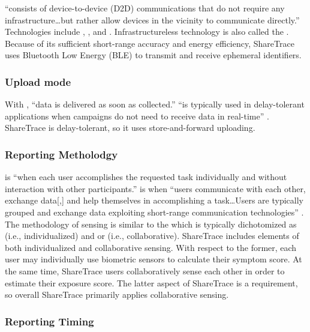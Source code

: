  ``consists of device-to-device (D2D) communications that do not require any infrastructure{\ldots}but rather allow devices in the vicinity to communicate directly.'' Technologies include , , and  \citep{Capponi2019}. Infrastructureless technology is also called the  \citep{Ma2014}. Because of its sufficient short-range accuracy and energy efficiency, ShareTrace uses Bluetooth Low Energy (BLE) to transmit and receive ephemeral identifiers.

\subsubsection{Upload mode}

With , ``data is delivered as soon as collected.''  ``is typically used in delay-tolerant applications when campaigns do not need to receive data in real-time'' \citep{Capponi2019}. ShareTrace is delay-tolerant, so it uses store-and-forward uploading.

\subsubsection{Reporting Metholodgy}

 is ``when each user accomplishes the requested task individually and without interaction with other participants.''  is when ``users communicate with each other, exchange data[,] and help themselves in accomplishing a task{\ldots}Users are typically grouped and exchange data exploiting short-range communication technologies'' \citep{Capponi2019}. The methodology of sensing is similar to the  which is typically dichotomized as  \citep{Lane2010, Ganti2011} (i.e., individualized) and  \citep{Ganti2011} or  \citep{Lane2010} (i.e., collaborative). ShareTrace includes elements of both individualized and collaborative sensing. With respect to the former, each user may individually use biometric sensors to calculate their symptom score. At the same time, ShareTrace users collaboratively sense each other in order to estimate their exposure score. The latter aspect of ShareTrace is a requirement, so overall ShareTrace primarily applies collaborative sensing.

\subsubsection{Reporting Timing}

